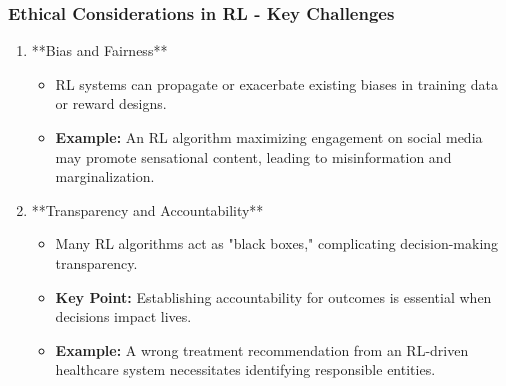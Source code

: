 \documentclass{beamer}
\begin{document}
\begin{frame}[fragile]
    \frametitle{Ethical Considerations in RL - Key Challenges}
    \begin{enumerate}
        \item **Bias and Fairness**
            \begin{itemize}
                \item RL systems can propagate or exacerbate existing biases in training data or reward designs.
                \item \textbf{Example:} An RL algorithm maximizing engagement on social media may promote sensational content, leading to misinformation and marginalization.
            \end{itemize}

        \item **Transparency and Accountability**
            \begin{itemize}
                \item Many RL algorithms act as "black boxes," complicating decision-making transparency.
                \item \textbf{Key Point:} Establishing accountability for outcomes is essential when decisions impact lives.
                \item \textbf{Example:} A wrong treatment recommendation from an RL-driven healthcare system necessitates identifying responsible entities.
            \end{itemize}
    \end{enumerate}
\end{frame}
\end{document}
